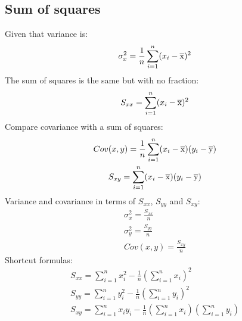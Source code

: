 \documentclass{article}
\begin{document}
\subsection{Sum of squares}
Given that variance is:
\begin{equation}
  \sigma^2_x = \frac{1}{n} \sum_{i=1}^n(x_i - \overline{\rm x})^2
\end{equation}
The sum of squares is the same but with no fraction:
\begin{equation}
  S_{xx} = \sum_{i=1}^n(x_i - \overline{\rm x})^2
\end{equation}
Compare covariance with a sum of squares:
\begin{equation}
  \begin{gathered}
    Cov(x,y) = \frac{1}{n} \sum_{i=1}^n(x_i - \overline{\rm x})(y_i - \overline{\rm y}) \\
    S_{xy} = \sum_{i=1}^n(x_i - \overline{\rm x})(y_i - \overline{\rm y})
  \end{gathered}
\end{equation}
Variance and covariance in terms of $S_{xx}$, $S_{yy}$ and $S_{xy}$:
\begin{equation}
  \begin{gathered}
    \sigma^2_x = \frac{S_{xx}}{n} \\
    \sigma^2_y = \frac{S_{yy}}{n} \\
    Cov(x,y) = \frac{S_{xy}}{n}
  \end{gathered}
\end{equation}
Shortcut formulas:
\begin{equation}
  \begin{gathered}
    S_{xx} = \sum_{i=1}^n x_i^2 - \frac{1}{n} (\sum_{i=1}^n x_i)^2 \\
    S_{yy} = \sum_{i=1}^n y_i^2 - \frac{1}{n} (\sum_{i=1}^n y_i)^2 \\
    S_{xy} = \sum_{i=1}^n x_iy_i - \frac{1}{n} (\sum_{i=1}^n x_i)(\sum_{i=1}^n y_i)
  \end{gathered}
\end{equation}
\end{document}
